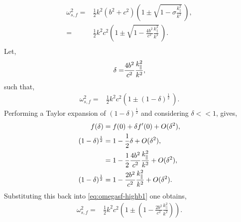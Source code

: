 \documentclass[a4paper,12pt,fourier,authoryear,custommargin]{Classes/PhDThesisPSnPDF}
\begin{document}
\begin{align}
    \omega^2_{s,f} =& \frac{1}{2}k^2(b^2+c^2)\left(1 \pm \sqrt{1 - \sigma \frac{k^2_\parallel}{k^2}}\,\right),\\
                   =& \frac{1}{2}k^2c^2\left(1 \pm \sqrt{1 - \frac{4b^2}{c^2} \frac{k^2_\parallel}{k^2}}\,\right).\\
\end{align}
Let,
\begin{align}
    \delta =& \frac{4b^2}{c^2} \frac{k^2_\parallel}{k^2},\notag\\
\end{align}
such that,
\begin{align}
    \omega^2_{s,f} =& \frac{1}{2}k^2c^2\left(1 \pm (1 - \delta)^{\frac{1}{2}}\,\right).\label{eq:omegasf-highb1}
\end{align}
Performing a Taylor expansion of $(1-\delta)^{\frac{1}{2}}$ and considering $\delta << 1$, gives,
\begin{align}
    f(\delta) &= f(0) + \delta f^\prime(0) + O(\delta^2),\notag\\
    (1-\delta)^{\frac{1}{2}} &= 1 - \frac{1}{2}\delta + O(\delta^2),\\
                             &= 1 - \frac{1}{2}\frac{4b^2}{c^2} \frac{k^2_\parallel}{k^2} + O(\delta^2),\\
    (1-\delta)^{\frac{1}{2}} &= 1 - \frac{2b^2}{c^2} \frac{k^2_\parallel}{k^2} + O(\delta^2).
\end{align}
Substituting this back into \cref{eq:omegasf-highb1} one obtains,
\begin{align}
    \omega^2_{s,f} =& \frac{1}{2}k^2c^2\left(1 \pm \left(1 - \frac{2b^2}{c^2} \frac{k^2_\parallel}{k^2}\right)\right).
\end{align}
\end{document}

